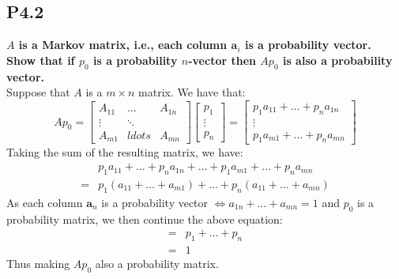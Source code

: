 \documentclass[12pt]{article}
\begin{document}
\subsection*{P4.2}
\textbf{$A$ is a Markov matrix, i.e., each column $\mathbf a_i$ is a probability vector. Show that if $p_0$ is a probability $n$-vector then $Ap_0$ is also a probability vector.}\\
Suppose that $A$ is a $m\times n$ matrix. We have that: 
$$
 Ap_0 = \begin{bmatrix}
A_{11} & \ldots & A_{1n}\\
\vdots & \ddots \\
A_{m1} & ldots & A_{mn}
\end{bmatrix} 
\begin{bmatrix}
p_1\\
\vdots\\
p_n
\end{bmatrix}
=
\begin{bmatrix}
p_1a_{11} + \ldots + p_na_{1n}\\
\vdots\\
p_1a_{m1} + \ldots + p_na_{mn}
\end{bmatrix}
$$
Taking the sum of the resulting matrix, we have: 
\begin{align*}
&p_1a_{11} + \ldots + p_na_{1n} + \ldots + p_1a_{m1} + \ldots + p_na_{mn}\\
=&p_1(a_{11} + \ldots + a_{m1}) + \ldots + p_n(a_{11} + \ldots + a_{mn})
\end{align*}
As each column $\mathbf a_n$ is a probability vector $\Leftrightarrow a_{1n} + \ldots + a_{mn} = 1$ and $p_0$ is a probability matrix, we then continue the above equation:
\begin{align*}
=&p_1 + \ldots + p_n\\
=&1
\end{align*}
Thus making $Ap_0$ also a probability matrix.


\end{document}
